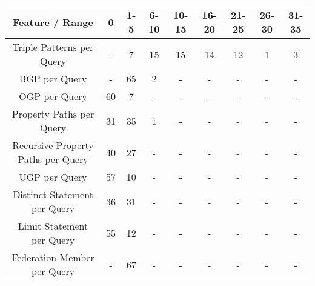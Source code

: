 \begin{center}
    \begin{tabular}{|*{9}{c|}}
     \hline
     Feature / Range & 0 & 1-5 & 6-10 & 10-15 & 16-20 & 21-25 & 26-30 & 31-35 \\ 
     \hline \hline
     Triple Patterns per Query & - & 7 & 15 & 15 & 14 & 12 & 1 & 3 \\ 
     \hline
     BGP per Query & - & 65 & 2 & - & - & - & - & - \\ 
     \hline
     OGP per Query & 60 & 7 & - & - & - & - & - & - \\ 
     \hline
     Property Paths per Query & 31 & 35 & 1 & - & - & - & - & - \\ 
     \hline
     Recursive Property Paths per Query & 40 & 27 & - & - & - & - & - & - \\ 
     \hline
     UGP per Query & 57 & 10 & - & - & - & - & - & - \\ 
     \hline
     Distinct Statement per Query & 36 & 31 & - & - & - & - & - & - \\ 
     \hline
     Limit Statement per Query & 55 & 12 & - & - & - & - & - & - \\  
     \hline
     Federation Member per Query & - & 67 & - & - & - & - & - & - \\  
     \hline
    \end{tabular}
\end{center}